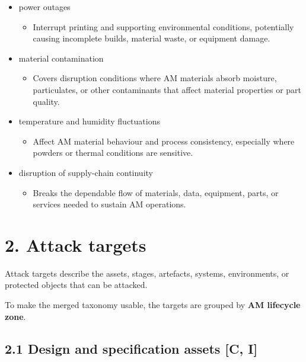 \documentclass[10pt,a4paper,oneside]{report}
\begin{document}
\begin{itemize}
\begin{itemize}
\item Represents exploited disaster conditions such as floods, earthquakes, hurricanes, or wildfires that can damage AM facilities or infrastructure.
\end{itemize}
\item power outages
\begin{itemize}
\item Interrupt printing and supporting environmental conditions, potentially causing incomplete builds, material waste, or equipment damage.
\end{itemize}
\item material contamination
\begin{itemize}
\item Covers disruption conditions where AM materials absorb moisture, particulates, or other contaminants that affect material properties or part quality.
\end{itemize}
\item temperature and humidity fluctuations
\begin{itemize}
\item Affect AM material behaviour and process consistency, especially where powders or thermal conditions are sensitive.
\end{itemize}
\item disruption of supply-chain continuity
\begin{itemize}
\item Breaks the dependable flow of materials, data, equipment, parts, or services needed to sustain AM operations.
\end{itemize}
\end{itemize}


\chapter{2. Attack targets}


Attack targets describe the assets, stages, artefacts, systems, environments, or protected objects that can be attacked.

To make the merged taxonomy usable, the targets are grouped by \textbf{AM lifecycle zone}.


\section{2.1 Design and specification assets [C, I]}
\end{document}
